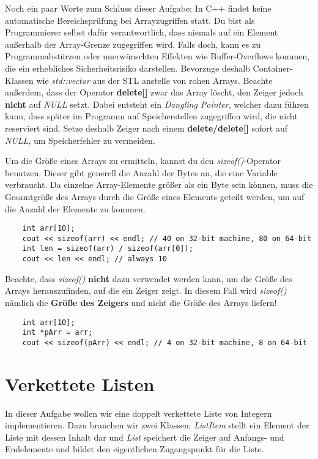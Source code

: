 Noch ein paar Worte zum Schluss dieser Aufgabe:
In C++ findet keine automatische Bereichsprüfung bei Arrayzugriffen statt. Du bist als Programmierer selbst dafür verantwortlich, dass niemals auf ein Element außerhalb der Array-Grenze zugegriffen wird.
Falls doch, kann es zu Programmabstürzen oder unerwünschten Effekten wie  Buffer-Overflows kommen, die ein erhebliches Sicherheitsrisiko darstellen.
Bevorzuge deshalb Container-Klassen wie \emph{std::vector} aus der STL anstelle von \glqq rohen\grqq{} Arrays.
Beachte außerdem, dass der Operator \textbf{delete[]} zwar das Array löscht, den Zeiger jedoch \textbf{nicht} auf \emph{NULL} setzt.
Dabei entsteht ein \emph{Dangling Pointer}, welcher dazu führen kann, dass später im Programm auf Speicherstellen zugegriffen wird, die nicht reserviert sind.
Setze deshalb Zeiger nach einem \textbf{delete/delete[]} sofort auf \emph{NULL}, um Speicherfehler zu vermeiden.

Um die Größe eines Arrays zu ermitteln, kannst du den \emph{sizeof()}-Operator benutzen. Dieser gibt generell die Anzahl der Bytes an, die eine Variable verbraucht. Da einzelne Array-Elemente größer als ein Byte sein können, muss die Gesamtgröße des Arrays durch die Größe eines Elements geteilt werden, um auf die Anzahl der Elemente zu kommen.
\begin{lstlisting}
	int arr[10];
	cout << sizeof(arr) << endl; // 40 on 32-bit machine, 80 on 64-bit
	int len = sizeof(arr) / sizeof(arr[0]); 
	cout << len << endl; // always 10
\end{lstlisting}

Beachte, dass \emph{sizeof()} \textbf{nicht} dazu verwendet werden kann, um die Größe des Arrays herauszufinden, auf die ein Zeiger zeigt. In diesem Fall wird \emph{sizeof()} nämlich die \textbf{Größe des Zeigers} und nicht die Größe des Arrays liefern!
\begin{lstlisting}
	int arr[10];
	int *pArr = arr;
	cout << sizeof(pArr) << endl; // 4 on 32-bit machine, 8 on 64-bit
\end{lstlisting}


\section{Verkettete Listen}
In dieser Aufgabe wollen wir eine doppelt verkettete Liste von Integern implementieren.
Dazu brauchen wir zwei Klassen: 
\emph{ListItem} stellt ein Element der Liste mit dessen Inhalt dar und \emph{List} speichert die Zeiger auf Anfangs- und Endelemente und bildet den eigentlichen Zugangspunkt für die Liste.


